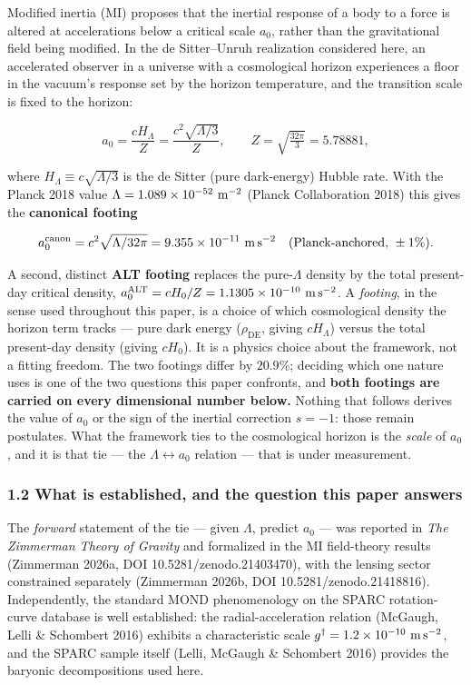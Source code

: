 \documentclass[
]{article}
\begin{document}
Modified inertia (MI) proposes that the inertial response of a body to a
force is altered at accelerations below a critical scale \(a_0\), rather
than the gravitational field being modified. In the de Sitter--Unruh
realization considered here, an accelerated observer in a universe with
a cosmological horizon experiences a floor in the vacuum's response set
by the horizon temperature, and the transition scale is fixed to the
horizon:

\[a_0 = \frac{cH_\Lambda}{Z} = \frac{c^2\sqrt{\Lambda/3}}{Z},\qquad Z=\sqrt{\tfrac{32\pi}{3}}=5.78881,\]

where \(H_\Lambda\equiv c\sqrt{\Lambda/3}\) is the de Sitter (pure
dark-energy) Hubble rate. With the Planck 2018 value
\(\Lambda=1.089\times10^{-52}\ {\rm m^{-2}}\) (Planck Collaboration
2018) this gives the \textbf{canonical footing}

\[a_0^\mathrm{canon}=c^2\sqrt{\Lambda/32\pi}=9.355\times10^{-11}\ {\rm m\,s^{-2}}\quad(\text{Planck-anchored, }\pm1\%).\]

A second, distinct \textbf{ALT footing} replaces the pure-\(\Lambda\)
density by the total present-day critical density,
\(a_0^\mathrm{ALT}=cH_0/Z=1.1305\times10^{-10}\ {\rm m\,s^{-2}}\). A
\emph{footing}, in the sense used throughout this paper, is a choice of
which cosmological density the horizon term tracks --- pure dark energy
(\(\rho_\mathrm{DE}\), giving \(cH_\Lambda\)) versus the total present-day
density (giving \(cH_0\)). It is a physics choice about the framework,
not a fitting freedom. The two footings differ by \(20.9\%\); deciding
which one nature uses is one of the two questions this paper confronts,
and \textbf{both footings are carried on every dimensional number
below.} Nothing that follows derives the value of \(a_0\) or the sign of
the inertial correction \(s=-1\): those remain postulates. What the
framework ties to the cosmological horizon is the \emph{scale} of
\(a_0\), and it is that tie --- the \(\Lambda\leftrightarrow a_0\)
relation --- that is under measurement.

\subsubsection{1.2 What is established, and the question this paper
answers}\label{what-is-established-and-the-question-this-paper-answers}

The \emph{forward} statement of the tie --- given \(\Lambda\), predict
\(a_0\) --- was reported in \emph{The Zimmerman Theory of Gravity} and
formalized in the MI field-theory results (Zimmerman 2026a, DOI
10.5281/zenodo.21403470), with the lensing sector constrained separately
(Zimmerman 2026b, DOI 10.5281/zenodo.21418816). Independently, the
standard MOND phenomenology on the SPARC rotation-curve database is well
established: the radial-acceleration relation (McGaugh, Lelli \&
Schombert 2016) exhibits a characteristic scale
\(g^\dagger=1.2\times10^{-10}\ {\rm m\,s^{-2}}\), and the SPARC sample
itself (Lelli, McGaugh \& Schombert 2016) provides the baryonic
decompositions used here.
\end{document}
